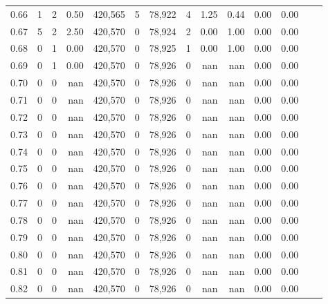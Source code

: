 \begin{tabular}{rrrrrrrrrrrrrr}
0.66 &       1 &      2 &    0.50 &  420,565 &        5 &  78,922 &       4 &  1.25 &  0.44 &  0.00 &      0.00 \\
0.67 &       5 &      2 &    2.50 &  420,570 &        0 &  78,924 &       2 &  0.00 &  1.00 &  0.00 &      0.00 \\
0.68 &       0 &      1 &    0.00 &  420,570 &        0 &  78,925 &       1 &  0.00 &  1.00 &  0.00 &      0.00 \\
0.69 &       0 &      1 &    0.00 &  420,570 &        0 &  78,926 &       0 &   nan &   nan &  0.00 &      0.00 \\
0.70 &       0 &      0 &     nan &  420,570 &        0 &  78,926 &       0 &   nan &   nan &  0.00 &      0.00 \\
0.71 &       0 &      0 &     nan &  420,570 &        0 &  78,926 &       0 &   nan &   nan &  0.00 &      0.00 \\
0.72 &       0 &      0 &     nan &  420,570 &        0 &  78,926 &       0 &   nan &   nan &  0.00 &      0.00 \\
0.73 &       0 &      0 &     nan &  420,570 &        0 &  78,926 &       0 &   nan &   nan &  0.00 &      0.00 \\
0.74 &       0 &      0 &     nan &  420,570 &        0 &  78,926 &       0 &   nan &   nan &  0.00 &      0.00 \\
0.75 &       0 &      0 &     nan &  420,570 &        0 &  78,926 &       0 &   nan &   nan &  0.00 &      0.00 \\
0.76 &       0 &      0 &     nan &  420,570 &        0 &  78,926 &       0 &   nan &   nan &  0.00 &      0.00 \\
0.77 &       0 &      0 &     nan &  420,570 &        0 &  78,926 &       0 &   nan &   nan &  0.00 &      0.00 \\
0.78 &       0 &      0 &     nan &  420,570 &        0 &  78,926 &       0 &   nan &   nan &  0.00 &      0.00 \\
0.79 &       0 &      0 &     nan &  420,570 &        0 &  78,926 &       0 &   nan &   nan &  0.00 &      0.00 \\
0.80 &       0 &      0 &     nan &  420,570 &        0 &  78,926 &       0 &   nan &   nan &  0.00 &      0.00 \\
0.81 &       0 &      0 &     nan &  420,570 &        0 &  78,926 &       0 &   nan &   nan &  0.00 &      0.00 \\
0.82 &       0 &      0 &     nan &  420,570 &        0 &  78,926 &       0 &   nan &   nan &  0.00 &      0.00 \\

\end{tabular}
